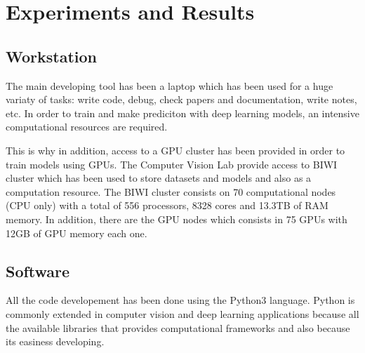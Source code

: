 
\chapter{Experiments and Results}
\label{cha:experimentsandresults}




\section{Workstation}

The main developing tool has been a laptop which has been used for a huge variaty of tasks: write code, debug, check papers and documentation, write notes, etc.
In order to train and make prediciton with deep learning models, an intensive computational resources are required.

This is why in addition, access to a GPU cluster has been provided in order to train models using GPUs.
The Computer Vision Lab provide access to BIWI cluster which has been used to store datasets and models and also as a computation resource. The BIWI cluster consists on 70 computational nodes (CPU only) with a total of 556 processors, 8328 cores and 13.3TB of RAM memory.
In addition, there are the GPU nodes which consists in 75 GPUs with 12GB of GPU memory each one.

\section{Software}

All the code developement has been done using the Python3 language.
Python is commonly extended in computer vision and deep learning applications because all the available libraries that provides computational frameworks and also because its easiness developing.

